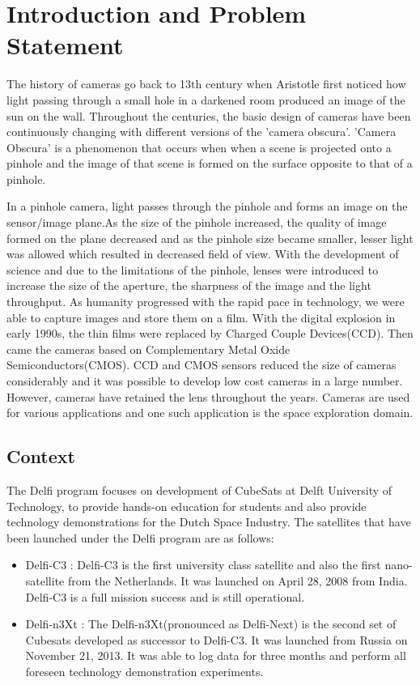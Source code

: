 \chapter{Introduction and Problem Statement}
\label{chp:introduction}
The history of cameras go back to 13th century when Aristotle first noticed how light passing through a small hole in a darkened room produced an image of the sun on the wall. 
Throughout the centuries, the basic design of cameras have been continuously changing with  different versions of the 'camera obscura'. 'Camera Obscura' is a phenomenon that occurs when when a scene is projected onto a pinhole and the image of that scene is formed on the surface opposite to that of a pinhole. 

In a pinhole camera, light passes through the pinhole and forms an image on the sensor/image plane.As the size of the pinhole increased, the quality of image formed on the plane decreased and as the pinhole size became smaller, lesser light was allowed which resulted in decreased field of view. With the development of science and due to the limitations of the pinhole, lenses were introduced to increase the size of the aperture, the sharpness of the image and the light throughput. As humanity progressed with the rapid pace in technology, we were able to capture images and store them on a film. With the digital explosion in early 1990s, the thin films were replaced by Charged Couple Devices(CCD). Then came the cameras based on Complementary Metal Oxide Semiconductors(CMOS). CCD and CMOS sensors reduced the size of cameras considerably and it was possible to develop low cost cameras in a large number. However, cameras have retained the lens throughout the years. Cameras are used for various applications and one such application is the space exploration domain. 

\section{Context}
The Delfi program focuses on development of CubeSats at Delft University of Technology, to provide hands-on education for students and also provide technology demonstrations for the Dutch Space Industry. The satellites that have been launched under the Delfi program are as follows:
\begin{itemize}
\item Delfi-C3 : Delfi-C3 is the first university class satellite and also the first nano-satellite from the Netherlands. It was launched on April 28, 2008 from India. Delfi-C3 is a full mission success and is still operational\cite{DelfiC3}.
\item Delfi-n3Xt : The Delfi-n3Xt(pronounced as Delfi-Next) is the second set of Cubesats developed as successor to Delfi-C3. It was launched from Russia on November 21, 2013. It was able to log data for three months and perform all foreseen technology demonstration experiments.
\end{itemize}

